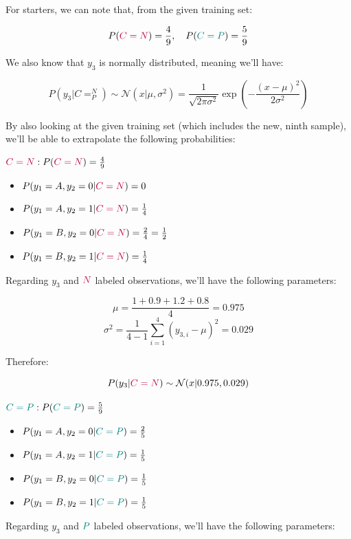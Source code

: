 \documentclass[12pt]{article}
\begin{document}
\begin{enumerate}[leftmargin=\labelsep]
        For starters, we can note that, from the given training set:

        $$
          P(\textcolor{purple}{C = N}) = \frac{4}{9}, \quad P(\textcolor{teal}{C = P}) = \frac{5}{9}
        $$

        We also know that $y_3$ is normally distributed, meaning we'll have:

        $$
          P(y_3 | C = ^N_P) \sim \mathcal{N}(x | \mu, \sigma^2) = \frac{1}{\sqrt{2 \pi \sigma^2}} \exp \left( - \frac{(x - \mu)^2}{2 \sigma^2} \right)
        $$

        By also looking at the given training set (which includes the new, ninth sample), we'll be able
        to extrapolate the following probabilities:

        \pagebreak

        \begin{multicols}{2}
          \setlength{\columnseprule}{1pt}
          \def\columnseprulecolor{\color{black}}
          \centering
          $\textcolor{purple}{C = N}: P(\textcolor{purple}{C = N}) = \frac{4}{9}$
          \begin{itemize}
            \item $P(y_1 = A, y_2 = 0 | \textcolor{purple}{C = N}) = 0$
            \item $P(y_1 = A, y_2 = 1 | \textcolor{purple}{C = N}) = \frac{1}{4}$
            \item $P(y_1 = B, y_2 = 0 | \textcolor{purple}{C = N}) = \frac{2}{4} = \frac{1}{2}$
            \item $P(y_1 = B, y_2 = 1 | \textcolor{purple}{C = N}) = \frac{1}{4}$
          \end{itemize}
          Regarding $y_3$ and $\textcolor{purple}{N}$ labeled observations, we'll have the following parameters:

          $$
            \mu = \frac{1 + 0.9 + 1.2 + 0.8}{4} = 0.975
          $$
          $$
            \sigma^2 = \frac{1}{4 - 1} \sum_{i = 1}^4 (y_{3, i} - \mu)^2 = 0.029
          $$

          Therefore:

          \vspace{-0.6cm}

          $$
            P(y_3 | \textcolor{purple}{C = N}) \sim \mathcal{N}(x | 0.975, 0.029)
          $$

          \columnbreak
          $\textcolor{teal}{C = P}: P(\textcolor{teal}{C = P}) = \frac{5}{9}$
          \begin{itemize}
            \item $P(y_1 = A, y_2 = 0 | \textcolor{teal}{C = P}) = \frac{2}{5}$
            \item $P(y_1 = A, y_2 = 1 | \textcolor{teal}{C = P}) = \frac{1}{5}$
            \item $P(y_1 = B, y_2 = 0 | \textcolor{teal}{C = P}) = \frac{1}{5}$
            \item $P(y_1 = B, y_2 = 1 | \textcolor{teal}{C = P}) = \frac{1}{5}$
          \end{itemize}
          Regarding $y_3$ and $\textcolor{teal}{P}$ labeled observations, we'll have the following parameters:


\end{multicols}
\end{enumerate}
\end{document}
